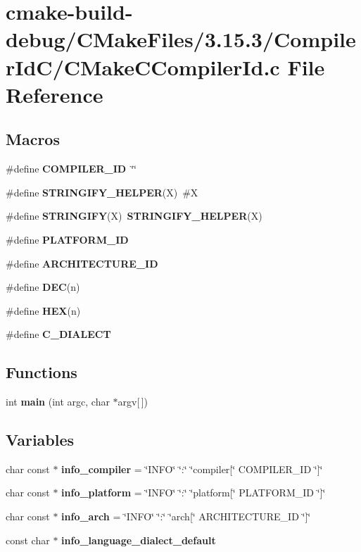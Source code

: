 \section{cmake-\/build-\/debug/\+C\+Make\+Files/3.15.3/\+Compiler\+Id\+C/\+C\+Make\+C\+Compiler\+Id.c File Reference}
\label{3_815_83_2_compiler_id_c_2_c_make_c_compiler_id_8c}
\subsection*{Macros}
\begin{DoxyCompactItemize}
\item 
\#define {\bf C\+O\+M\+P\+I\+L\+E\+R\+\_\+\+ID}~\char`\"{}\char`\"{}
\item 
\#define {\bf S\+T\+R\+I\+N\+G\+I\+F\+Y\+\_\+\+H\+E\+L\+P\+ER}(X)~\#X
\item 
\#define {\bf S\+T\+R\+I\+N\+G\+I\+FY}(X)~{\bf S\+T\+R\+I\+N\+G\+I\+F\+Y\+\_\+\+H\+E\+L\+P\+ER}(X)
\item 
\#define {\bf P\+L\+A\+T\+F\+O\+R\+M\+\_\+\+ID}
\item 
\#define {\bf A\+R\+C\+H\+I\+T\+E\+C\+T\+U\+R\+E\+\_\+\+ID}
\item 
\#define {\bf D\+EC}(n)
\item 
\#define {\bf H\+EX}(n)
\item 
\#define {\bf C\+\_\+\+D\+I\+A\+L\+E\+CT}
\end{DoxyCompactItemize}
\subsection*{Functions}
\begin{DoxyCompactItemize}
\item 
int {\bf main} (int argc, char $\ast$argv[$\,$])
\end{DoxyCompactItemize}
\subsection*{Variables}
\begin{DoxyCompactItemize}
\item 
char const $\ast$ {\bf info\+\_\+compiler} = \char`\"{}I\+N\+FO\char`\"{} \char`\"{}\+:\char`\"{} \char`\"{}compiler[\char`\"{} C\+O\+M\+P\+I\+L\+E\+R\+\_\+\+ID \char`\"{}]\char`\"{}
\item 
char const $\ast$ {\bf info\+\_\+platform} = \char`\"{}I\+N\+FO\char`\"{} \char`\"{}\+:\char`\"{} \char`\"{}platform[\char`\"{} P\+L\+A\+T\+F\+O\+R\+M\+\_\+\+ID \char`\"{}]\char`\"{}
\item 
char const $\ast$ {\bf info\+\_\+arch} = \char`\"{}I\+N\+FO\char`\"{} \char`\"{}\+:\char`\"{} \char`\"{}arch[\char`\"{} A\+R\+C\+H\+I\+T\+E\+C\+T\+U\+R\+E\+\_\+\+ID \char`\"{}]\char`\"{}
\item 
const char $\ast$ {\bf info\+\_\+language\+\_\+dialect\+\_\+default}
\end{DoxyCompactItemize}


